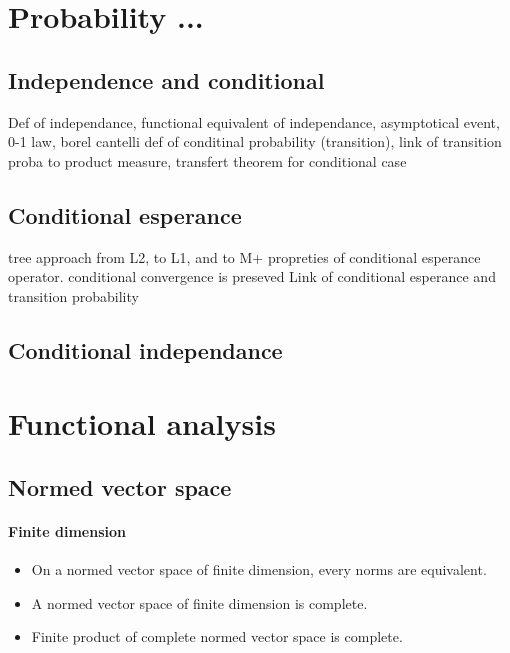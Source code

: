 \documentclass[a4paper,10pt]{article}
\begin{document}
\section{Probability ...}%
\subsection{Independence and conditional}
Def of independance, functional equivalent of independance, asymptotical event, 0-1 law, borel cantelli
def of conditinal probability (transition), link of transition proba to product measure, transfert theorem for conditional case
\subsection{Conditional esperance}
tree approach from L2, to L1, and to M+
propreties of conditional esperance operator.
conditional convergence is preseved
Link of conditional esperance and transition probability
\subsection{Conditional independance}

 
 
 
 
 
 
 
 
 
 
 
 
\section{Functional analysis}
\subsection{Normed vector space} 
\paragraph{Finite dimension}
\begin{itemize}
 \item On a normed vector space of finite dimension, every norms are equivalent.
 \item A normed vector space of finite dimension is complete.
 \item Finite product of complete normed vector space is complete.
\end{itemize}
\end{document}
